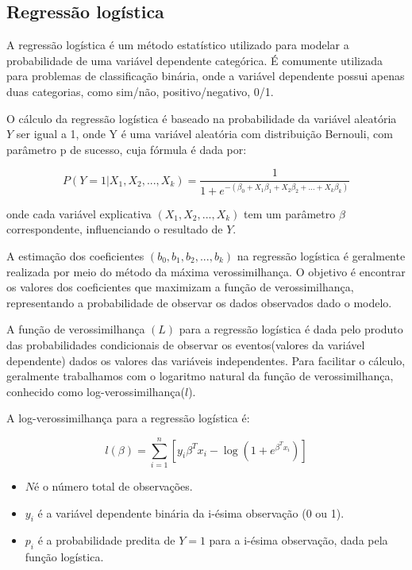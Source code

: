 
 \subsection{Regressão logística}
 A regressão logística é um método estatístico utilizado para modelar a probabilidade de uma variável 
dependente categórica. É comumente utilizada para problemas de classificação binária, onde a variável
dependente possui apenas duas categorias, como sim/não, positivo/negativo, 0/1.


O cálculo da regressão logística é baseado na probabilidade da variável aleatória $Y$ ser igual a 1, onde Y é 
uma variável aleatória com distribuição Bernouli, com parâmetro p de sucesso, cuja fórmula é dada por:

\begin{equation}
  P(Y=1| X_1, X_2, ..., X_k) = \frac{1}{1 + e^{-(\beta_0 + X_{1}\beta_1 + X_{2}\beta_2 + \ldots +X_{k}\beta_k)}}
\end{equation}

\noindent onde cada variável explicativa $(X_1, X_2, ..., X_k)$ tem um parâmetro $\beta$ correspondente, influenciando o resultado de $Y$.

A estimação dos coeficientes $(b_0, b_1, b_2, ..., b_k)$  na regressão logística é geralmente realizada por meio 
do método da máxima verossimilhança. O objetivo é encontrar os valores dos coeficientes que maximizam a função de
verossimilhança, representando a probabilidade de observar os dados observados dado o modelo.
 
A função de verossimilhança $(L)$ para a regressão logística é dada pelo produto das probabilidades condicionais
de observar os eventos(valores da variável dependente) dados os valores das variáveis independentes. Para facilitar o cálculo, 
geralmente trabalhamos com o logaritmo natural da função de verossimilhança, conhecido como log-verossimilhança($l$).

A log-verossimilhança para a regressão logística é:

\begin{equation}
  l(\beta) = \sum_{i=1}^{n} [y_i \beta^T x_i - \log(1 + e^{\beta^T x_i})]
\end{equation}


\begin{itemize}
  \item  $N$é o número total de observações.
  \item  $y_i$ é a variável dependente binária da i-ésima observação (0 ou 1).
  \item $p_i$ é a probabilidade predita de $Y=1$ para a i-ésima observação, dada pela função logística.
\end{itemize}

